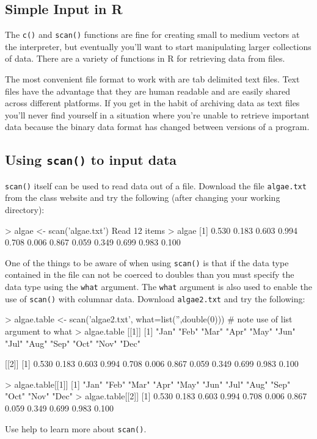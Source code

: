 \subsection{Simple Input in R}

The \lstinline!c()! and \lstinline!scan()! functions are fine for
creating small to medium vectors at the interpreter, but eventually
you'll want to start manipulating larger collections of data. There are
a variety of functions in R for retrieving data from files.

The most convenient file format to work with are tab delimited text
files. Text files have the advantage that they are human readable and
are easily shared across different platforms. If you get in the habit of
archiving data as text files you'll never find yourself in a situation
where you're unable to retrieve important data because the binary data
format has changed between versions of a program.

\subsection{Using \lstinline!scan()! to input data}

\lstinline!scan()! itself can be used to read data out of a file.
Download the file \lstinline!algae.txt! from the class website and try
the following (after changing your working directory):

\begin{R}
> algae <- scan('algae.txt')
Read 12 items
> algae
 [1] 0.530 0.183 0.603 0.994 0.708 0.006 0.867 0.059 0.349 0.699 0.983 0.100
\end{R}
One of the things to be aware of when using \lstinline!scan()! is that
if the data type contained in the file can not be coerced to doubles
than you must specify the data type using the \lstinline!what! argument.
The \lstinline!what! argument is also used to enable the use of
\lstinline!scan()! with columnar data. Download \lstinline!algae2.txt!
and try the following:

\begin{R}
> algae.table <- scan('algae2.txt', what=list('',double(0))) 
                        # note use of list argument to what
> algae.table
[[1]]
 [1] "Jan" "Feb" "Mar" "Apr" "May" "Jun" "Jul" "Aug" "Sep" "Oct" "Nov" "Dec"

[[2]]
 [1] 0.530 0.183 0.603 0.994 0.708 0.006 0.867 0.059 0.349 0.699 0.983 0.100

> algae.table[[1]]
 [1] "Jan" "Feb" "Mar" "Apr" "May" "Jun" "Jul" "Aug" "Sep" "Oct" "Nov" "Dec"
> algae.table[[2]]
 [1] 0.530 0.183 0.603 0.994 0.708 0.006 0.867 0.059 0.349 0.699 0.983 0.100
\end{R}
Use help to learn more about \lstinline!scan()!.

